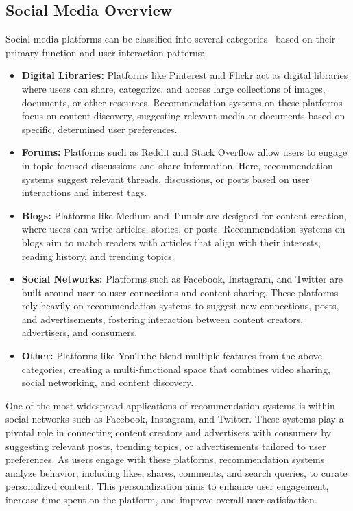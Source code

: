 \documentclass[10pt,twocolumn,twoside,a4paper]{article} %
\begin{document}
\subsection{Social Media Overview}
Social media platforms can be classified into several categories~\cite{anandhan2018social} based on their primary function and user interaction patterns:
\begin{itemize}
    \item \textbf{Digital Libraries:} Platforms like Pinterest and Flickr act as digital libraries where users can share, categorize, and access large collections of images, documents, or other resources. Recommendation systems on these platforms focus on content discovery, suggesting relevant media or documents based on specific, determined user preferences.
    \item \textbf{Forums:} Platforms such as Reddit and Stack Overflow allow users to engage in topic-focused discussions and share information. Here, recommendation systems suggest relevant threads, discussions, or posts based on user interactions and interest tags.
    \item \textbf{Blogs:} Platforms like Medium and Tumblr are designed for content creation, where users can write articles, stories, or posts. Recommendation systems on blogs aim to match readers with articles that align with their interests, reading history, and trending topics.
    \item \textbf{Social Networks:} Platforms such as Facebook, Instagram, and Twitter are built around user-to-user connections and content sharing. These platforms rely heavily on recommendation systems to suggest new connections, posts, and advertisements, fostering interaction between content creators, advertisers, and consumers.
    \item \textbf{Other:} Platforms like YouTube blend multiple features from the above categories, creating a multi-functional space that combines video sharing, social networking, and content discovery.
\end{itemize}

One of the most widespread applications of recommendation systems is within social networks such as Facebook, Instagram, and Twitter. These systems play a pivotal role in connecting content creators and advertisers with consumers by suggesting relevant posts, trending topics, or advertisements tailored to user preferences. As users engage with these platforms, recommendation systems analyze behavior, including likes, shares, comments, and search queries, to curate personalized content. This personalization aims to enhance user engagement, increase time spent on the platform, and improve overall user satisfaction.
\end{document}
